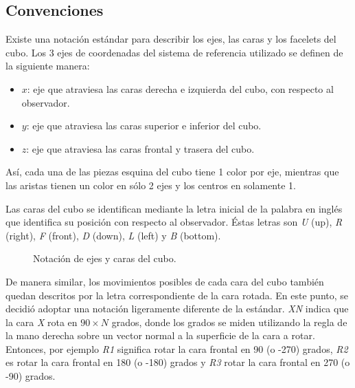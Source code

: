 \subsection{Convenciones}
Existe una notación estándar para describir los ejes, las caras y los facelets del cubo.
Los 3 ejes de coordenadas del sistema de referencia utilizado se definen de la siguiente manera:
\begin{itemize}
	\item $x$: eje que atraviesa las caras derecha e izquierda del cubo, con respecto al observador.
	\item $y$: eje que atraviesa las caras superior e inferior del cubo.
	\item $z$: eje que atraviesa las caras frontal y trasera del cubo.
\end{itemize}
Así, cada una de las piezas esquina del cubo tiene 1 color por eje, mientras que las aristas tienen un color en sólo 2 ejes y los centros en solamente 1.

Las caras del cubo se identifican mediante la letra inicial de la palabra en inglés que identifica su posición con respecto al observador.
Éstas letras son \textit{U} (up), \textit{R} (right), \textit{F} (front), \textit{D} (down), \textit{L} (left) y \textit{B} (bottom).

\begin{figure}[h!]
	\centering
	\hfill
	\caption{Notación de ejes y caras del cubo.}
\end{figure}
De manera similar, los movimientos posibles de cada cara del cubo también quedan descritos por la letra correspondiente de la cara rotada.
En este punto, se decidió adoptar una notación ligeramente diferente de la estándar.
\textit{XN} indica que la cara \textit{X} rota en $90 \times N$ grados, donde los grados se miden utilizando la regla de la mano derecha sobre un vector normal a la superficie de la cara a rotar.
Entonces, por ejemplo \textit{R1} significa rotar la cara frontal en 90 (o -270) grados, \textit{R2} es rotar la cara frontal en 180 (o -180) grados y \textit{R3} rotar la cara frontal en 270 (o -90) grados.

